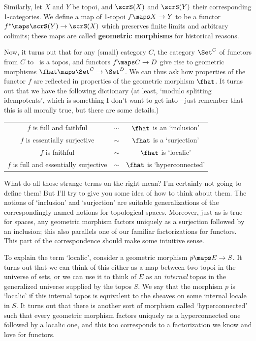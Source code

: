 \documentclass[12pt]{amsart}
\begin{document}
Similarly, let $X$ and $Y$ be topoi, and $\scrS(X)$ and $\scrS(Y)$
their corresponding 1-categories.  We define a map of 1-topoi $f\maps
X\to Y$ to be a functor $f^*\maps \scrS(Y)\to \scrS(X)$ which
preserves finite limits and arbitrary colimits; these maps are called
\textbf{geometric morphisms} for historical reasons.

Now, it turns out that for any (small) category $C$, the category
$\Set^C$ of functors from $C$ to \Set\ is a topos, and functors
$f\maps C\to D$ give rise to geometric morphisms $\fhat\maps \Set^C\to
\Set^D$.  We can thus ask how properties of the functor $f$ are
reflected in properties of the geometric morphism $\fhat$.  It turns
out that we have the following dictionary (at least, `modulo splitting
idempotents', which is something I don't want to get into---just
remember that this is all morally true, but there are some details.)

\begin{center}
  \begin{tabular}{ccc}
    $f$ is full and faithful & $\sim$ & $\fhat$ is an `inclusion'\\
    $f$ is essentially surjective & $\sim$ & $\fhat$ is a `surjection'\\
    $f$ is faithful & $\sim$ & $\fhat$ is `localic'\\
    $f$ is full and essentially surjective & $\sim$ & $\fhat$ is `hyperconnected'
  \end{tabular}
\end{center}

What do all those strange terms on the right mean?  I'm certainly not
going to define them!  But I'll try to give you some idea of how to
think about them.  The notions of `inclusion' and `surjection' are
suitable generalizations of the correspondingly named notions for
topological spaces.  Moreover, just as is true for spaces, any
geometric morphism factors uniquely as a surjection followed by an
inclusion; this also parallels one of our familiar factorizations for
functors.  This part of the correspondence should make some intuitive
sense.

To explain the term `localic', consider a geometric morphism $p\maps
E\to S$.  It turns out that we can think of this either as a map
between two topoi in the universe of sets, or we can use it to think
of $E$ as an \emph{internal} topos in the generalized universe
supplied by the topos $S$.  We say that the morphism $p$ is `localic'
if this internal topos is equivalent to the sheaves on some internal
locale in $S$.  It turns out that there is another sort of morphism
called `hyperconnected' such that every geometric morphism factors
uniquely as a hyperconnected one followed by a localic one, and this
too corresponds to a factorization we know and love for functors.
\end{document}
